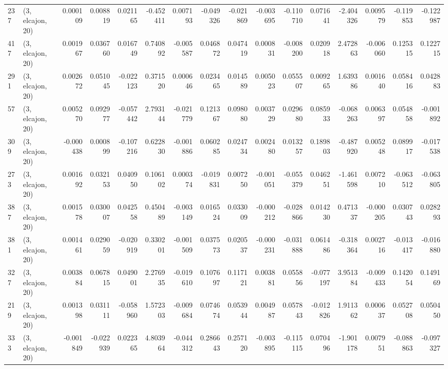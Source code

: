 \begin{tabular}{llrrrrrrrrrrrrrr}
237 &  (3, elcajon, 20) &   0.000109 &  0.008819 &  0.021165 &  -0.452411 &  0.007193 &  -0.049326 & -0.021869 & -0.003695 & -0.110710 &  0.071641 &    -2.404326 &   0.009579 &  -0.119853 &  -0.122987 \\
417 &  (3, elcajon, 20) &   0.001967 &  0.036760 &  0.016749 &   0.740892 & -0.005587 &   0.046872 &  0.047419 &  0.000831 & -0.008200 &  0.020918 &     2.472863 &  -0.006060 &   0.125315 &   0.122715 \\
291 &  (3, elcajon, 20) &   0.002672 &  0.051045 & -0.022123 &   0.371520 &  0.000646 &   0.023465 &  0.014589 &  0.005023 &  0.055507 &  0.009265 &     1.639386 &   0.001640 &   0.058416 &   0.042883 \\
57  &  (3, elcajon, 20) &   0.005270 &  0.092977 & -0.057442 &   2.793144 & -0.021779 &   0.121367 &  0.098080 &  0.003729 &  0.029680 &  0.085933 &    -0.068263 &   0.006397 &   0.054858 &  -0.001892 \\
309 &  (3, elcajon, 20) &  -0.000438 &  0.000899 & -0.107216 &   0.622830 & -0.001886 &   0.060285 &  0.024734 &  0.002480 &  0.013257 &  0.189803 &    -0.487920 &   0.005248 &   0.089917 &  -0.017538 \\
273 &  (3, elcajon, 20) &   0.001692 &  0.032153 &  0.040950 &   0.106102 &  0.000374 &  -0.019831 &  0.007250 & -0.001051 & -0.055379 &  0.046251 &    -1.461598 &   0.007210 &  -0.063512 &  -0.063805 \\
387 &  (3, elcajon, 20) &   0.001578 &  0.030007 &  0.042558 &   0.450489 & -0.003149 &   0.016524 &  0.033009 & -0.000212 & -0.028866 &  0.014230 &     0.471337 &  -0.000205 &   0.030743 &   0.028293 \\
381 &  (3, elcajon, 20) &   0.001461 &  0.029059 & -0.020919 &   0.330201 & -0.001509 &   0.037573 &  0.020537 & -0.000231 & -0.031888 &  0.061486 &    -0.318364 &   0.002716 &  -0.013417 &  -0.016880 \\
327 &  (3, elcajon, 20) &   0.003884 &  0.067815 &  0.049001 &   2.276935 & -0.019610 &   0.107697 &  0.117121 &  0.003881 &  0.055856 & -0.077197 &     3.951384 &  -0.009433 &   0.142054 &   0.149169 \\
219 &  (3, elcajon, 20) &   0.001398 &  0.031111 & -0.058960 &   1.572303 & -0.009684 &   0.074674 &  0.053944 &  0.004987 &  0.057843 & -0.012826 &     1.911362 &   0.000637 &   0.052708 &   0.050450 \\
333 &  (3, elcajon, 20) &  -0.001849 & -0.022939 &  0.022365 &   4.803964 & -0.044312 &   0.286643 &  0.257120 & -0.003895 & -0.115115 &  0.070496 &    -1.901178 &   0.007951 &  -0.088863 &  -0.097327 \\

\end{tabular}
